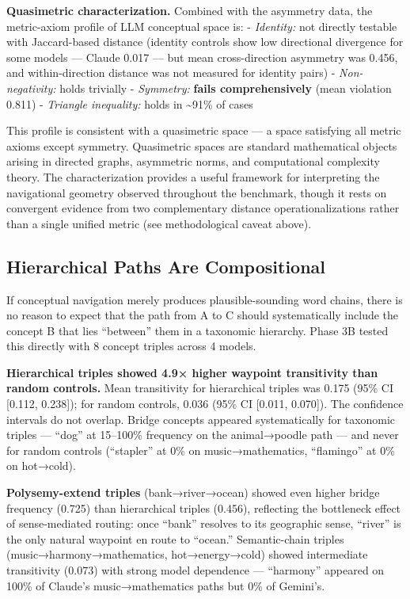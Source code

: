 \textbf{Quasimetric characterization.} Combined with the asymmetry data, the metric-axiom profile of LLM conceptual space is: - \emph{Identity:} not directly testable with Jaccard-based distance (identity controls show low directional divergence for some models --- Claude 0.017 --- but mean cross-direction asymmetry was 0.456, and within-direction distance was not measured for identity pairs) - \emph{Non-negativity:} holds trivially - \emph{Symmetry:} \textbf{fails comprehensively} (mean violation 0.811) - \emph{Triangle inequality:} holds in \textasciitilde91\% of cases

This profile is consistent with a quasimetric space --- a space satisfying all metric axioms except symmetry. Quasimetric spaces are standard mathematical objects arising in directed graphs, asymmetric norms, and computational complexity theory. The characterization provides a useful framework for interpreting the navigational geometry observed throughout the benchmark, though it rests on convergent evidence from two complementary distance operationalizations rather than a single unified metric (see methodological caveat above).

\subsection{Hierarchical Paths Are Compositional}\label{hierarchical-paths-are-compositional}

If conceptual navigation merely produces plausible-sounding word chains, there is no reason to expect that the path from A to C should systematically include the concept B that lies ``between'' them in a taxonomic hierarchy. Phase 3B tested this directly with 8 concept triples across 4 models.

\textbf{Hierarchical triples showed 4.9× higher waypoint transitivity than random controls.} Mean transitivity for hierarchical triples was 0.175 (95\% CI {[}0.112, 0.238{]}); for random controls, 0.036 (95\% CI {[}0.011, 0.070{]}). The confidence intervals do not overlap. Bridge concepts appeared systematically for taxonomic triples --- ``dog'' at 15--100\% frequency on the animal→poodle path --- and never for random controls (``stapler'' at 0\% on music→mathematics, ``flamingo'' at 0\% on hot→cold).

\textbf{Polysemy-extend triples} (bank→river→ocean) showed even higher bridge frequency (0.725) than hierarchical triples (0.456), reflecting the bottleneck effect of sense-mediated routing: once ``bank'' resolves to its geographic sense, ``river'' is the only natural waypoint en route to ``ocean.'' Semantic-chain triples (music→harmony→mathematics, hot→energy→cold) showed intermediate transitivity (0.073) with strong model dependence --- ``harmony'' appeared on 100\% of Claude's music→mathematics paths but 0\% of Gemini's.

